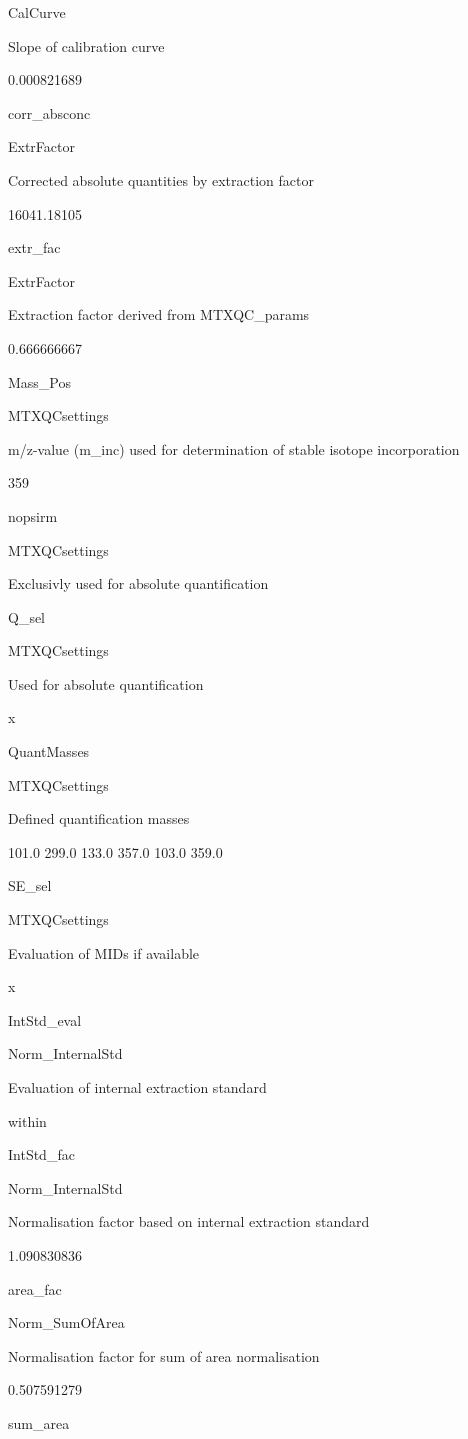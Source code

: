\documentclass[]{book}
\theoremstyle{definition}
\theoremstyle{definition}
\theoremstyle{definition}
\theoremstyle{remark}
\begin{document}
CalCurve

Slope of calibration curve

0.000821689

corr\_absconc

ExtrFactor

Corrected absolute quantities by extraction factor

16041.18105

extr\_fac

ExtrFactor

Extraction factor derived from MTXQC\_params

0.666666667

Mass\_Pos

MTXQCsettings

m/z-value (m\_inc) used for determination of stable isotope
incorporation

359

nopsirm

MTXQCsettings

Exclusivly used for absolute quantification

Q\_sel

MTXQCsettings

Used for absolute quantification

x

QuantMasses

MTXQCsettings

Defined quantification masses

101.0 299.0 133.0 357.0 103.0 359.0

SE\_sel

MTXQCsettings

Evaluation of MIDs if available

x

IntStd\_eval

Norm\_InternalStd

Evaluation of internal extraction standard

within

IntStd\_fac

Norm\_InternalStd

Normalisation factor based on internal extraction standard

1.090830836

area\_fac

Norm\_SumOfArea

Normalisation factor for sum of area normalisation

0.507591279

sum\_area
\end{document}
